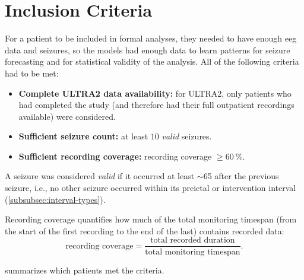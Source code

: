 \section{Inclusion Criteria}\label{sec:inclusion-criteria}

For a patient to be included in formal analyses, they needed to have enough \gls{eeg} data and seizures, so the models had enough data to learn patterns for seizure forecasting and for statistical validity of the analysis.
All of the following criteria had to be met:
\begin{itemize}
    \item \textbf{Complete ULTRA2 data availability:} for ULTRA2, only patients who had completed the study (and therefore had their full outpatient recordings available) were considered.
    \item \textbf{Sufficient seizure count:} at least $10$ \emph{valid} seizures.
    \item \textbf{Sufficient recording coverage:} recording coverage $\geq\SI{60}{\percent}$.
\end{itemize}

A seizure was considered \emph{valid} if it occurred at least $\sim$\SI{65}{\min} after the previous seizure, i.e., no other seizure occurred within its preictal or intervention interval (\cref{subsubsec:interval-types}).

Recording coverage quantifies how much of the total monitoring timespan (from the start of the first recording to the end of the last) contains recorded data:
\[
\text{recording coverage} = \frac{\text{total recorded duration}}{\text{total monitoring timespan}}.
\]

 summarizes which patients met the criteria.

\begin{table}[hptb]
    \centering
    \caption[Patient inclusion criteria]{\textbf{Patient inclusion criteria.}\\
    Next to the valid seizures and recording coverage, it is denoted whether the corresponding criteria were met ($\checkmark$) or not ($\times$). ULTRA2 patients who had not completed the study are omitted.}
    \label{tab:patient-inclusion}
    \setlength{\tabcolsep}{9pt}
    \renewcommand{\arraystretch}{1.15}
    
\end{table}
